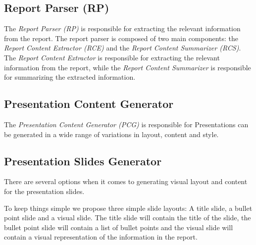 \subsection{Report Parser (RP)}
The \emph{Report Parser (RP)} is responsible for extracting the relevant information from the report. The report parser is composed of two main components: the \emph{Report Content Extractor (RCE)} and the \emph{Report Content Summarizer (RCS)}. The \emph{Report Content Extractor} is responsible for extracting the relevant information from the report, while the \emph{Report Content Summarizer} is responsible for summarizing the extracted information.

\subsection{Presentation Content Generator}
The \emph{Presentation Content Generator (PCG)} is responsible for 
Presentations can be generated in a wide range of variations in layout, content and style. 

\subsection{Presentation Slides Generator}
There are several options when it comes to generating visual layout and content for the presentation slides. 

To keep things simple we propose three simple slide layouts: A title slide, a bullet point slide and a visual slide. The title slide will contain the title of the slide, the bullet point slide will contain a list of bullet points and the visual slide will contain a visual representation of the information in the report.

